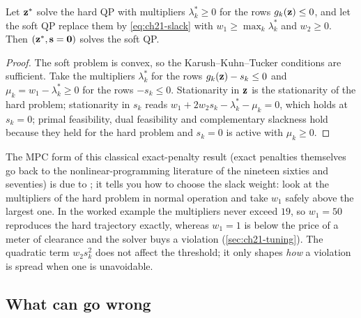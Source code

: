 \begin{proposition}
\label{thm:ch21-exact}
Let $\mathbf{z}^{*}$ solve the hard QP with multipliers $\lambda_k^{*}\ge0$ for
the rows $g_k(\mathbf{z})\le0$, and let the soft QP replace them by
\cref{eq:ch21-slack} with $w_1\ge\max_k\lambda_k^{*}$ and $w_2\ge0$. Then
$(\mathbf{z}^{*},\mathbf{s}=\mathbf{0})$ solves the soft QP.
\end{proposition}
\begin{proof}
The soft problem is convex, so the Karush--Kuhn--Tucker conditions are
sufficient. Take the multipliers $\lambda_k^{*}$ for the rows
$g_k(\mathbf{z})-s_k\le0$ and $\mu_k=w_1-\lambda_k^{*}\ge0$ for the rows
$-s_k\le0$. Stationarity in $\mathbf{z}$ is the stationarity of the hard problem;
stationarity in $s_k$ reads $w_1+2w_2s_k-\lambda_k^{*}-\mu_k=0$, which holds at
$s_k=0$; primal feasibility, dual feasibility and complementary slackness hold
because they held for the hard problem and $s_k=0$ is active with
$\mu_k\ge0$. \qedhere
\end{proof}

The MPC form of this classical exact-penalty result (exact penalties
themselves go back to the nonlinear-programming literature of the nineteen
sixties and seventies) is due to \textcite{kerrigan2000soft}; it tells you how to choose the
slack weight: look at the multipliers of the hard problem in normal operation
and take $w_1$ safely above the largest one. In the worked example the
multipliers never exceed $19$, so $w_1=50$ reproduces the hard trajectory
exactly, whereas $w_1=1$ is below the price of a meter of clearance and the
solver buys a violation (\cref{sec:ch21-tuning}). The quadratic term
$w_2s_k^2$ does not affect the threshold; it only shapes \emph{how} a
violation is spread when one is unavoidable.

\subsection{What can go wrong}


